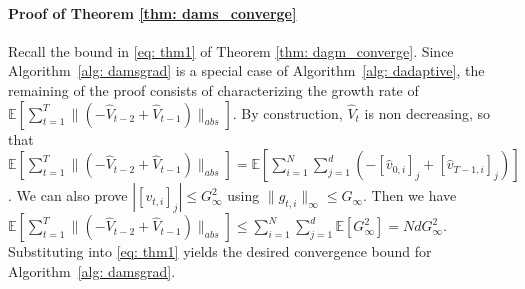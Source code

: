 \documentclass[anon,12pt]{colt2021} %
\begin{document}
\paragraph{Proof of Theorem \ref{thm: dams_converge}} 
Recall the bound in \eqref{eq: thm1} of Theorem \ref{thm: dagm_converge}.
Since Algorithm~\ref{alg: damsgrad} is a special case of Algorithm~\ref{alg: dadaptive}, the remaining of the proof consists of characterizing the growth rate of $\mathbb E [ \sum_{t=1}^{T}   \|    (- \hat V_{t-2} + \hat V_{t-1} ) \|_{abs} ]$.
By construction, $\hat V_t$ is non decreasing, so that
$
\mathbb E [ \sum_{t=1}^{T}   \|    (- \hat V_{t-2} + \hat V_{t-1} ) \|_{abs} ] = \mathbb E [   \sum_{i=1}^N \sum_{j=1}^d    (- [\hat v_{0,i}]_j + [\hat v_{T-1,i}]_j ) ]
$.
We can also prove $|[v_{t,i}]_j| \leq G^2_{\infty}$ using $\|g_{t,i}\|_{\infty} \leq G_{\infty}$.
Then we have $\mathbb E \left[ \sum_{t=1}^{T}   \|    (- \hat V_{t-2} + \hat V_{t-1} ) \|_{abs} \right] \leq  \sum_{i=1}^N \sum_{j=1}^d  \mathbb E[G_{\infty}^2]=  Nd G_{\infty}^2$.
Substituting into \eqref{eq: thm1} yields the desired convergence bound for Algorithm~\ref{alg: damsgrad}.
\end{document}
